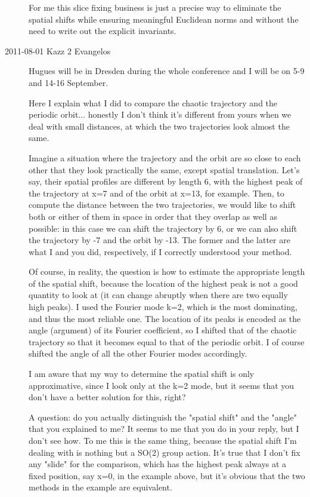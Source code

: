 \begin{description}
For me this slice fixing business is just a precise way to eliminate
the spatial shifts while ensuring meaningful Euclidean norms and
without the need to write out the explicit invariants.

\item[2011-08-01 Kazz 2 Evangelos] Hugues will be in Dresden during 
the whole conference  
and I will be on 5-9 and 14-16 September.

Here I explain what I did to compare the chaotic trajectory and the periodic 
orbit... honestly I don't think it's different from yours when we deal 
with small distances, at which the two trajectories look almost the same.

Imagine a situation where the trajectory and the orbit are so close to each 
other that they look practically the same, except spatial translation. 
Let's say, their spatial profiles are different by length 6, with the highest 
peak of the trajectory at x=7 and of the orbit at x=13, for example. 
Then, to compute the distance between the two trajectories, we would like 
to shift both or either of them in space in order that they overlap as well 
as possible: in this case we can shift the trajectory by 6, or we can also 
shift the trajectory by -7 and the orbit by -13. The former and the latter 
are what I and you did, respectively, if I correctly understood your method.

Of course, in reality, the question is how to estimate the appropriate 
length of the spatial shift, because the location of the highest peak is 
not a good quantity to look at (it can change abruptly when there are two 
equally high peaks). I used the Fourier mode k=2, which is the most dominating, 
and thus the most reliable one. The location of its peaks is encoded as 
the angle (argument) of its Fourier coefficient, so I shifted that of 
the chaotic trajectory so that it becomes equal to that of the periodic orbit. 
I of course shifted the angle of all the other Fourier modes accordingly.

I am aware that my way to determine the spatial shift is only approximative, 
since I look only at the k=2 mode, but it seems that you don't have a better 
solution for this, right?

A question: do you actually distinguish the "spatial shift" and the "angle" 
that you explained to me? It seems to me that you do in your reply, but 
I don't see how. To me this is the same thing, because the spatial shift 
I'm dealing with is nothing but a SO(2) group action. It's true that 
I don't fix any "slide" for the comparison, which has the highest peak 
always at a fixed position, say x=0, in the example above, but it's obvious 
that the two methods in the example are equivalent.


\end{description}
